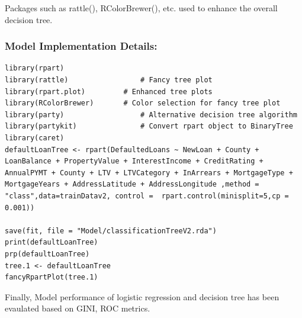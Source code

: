 Packages such as rattle(), RColorBrewer(), etc. used to enhance the overall decision tree.

\subsubsection*{Model Implementation Details:}

\begin{verbatim}
library(rpart)
library(rattle)					# Fancy tree plot
library(rpart.plot)			# Enhanced tree plots
library(RColorBrewer)		# Color selection for fancy tree plot
library(party)					# Alternative decision tree algorithm
library(partykit)				# Convert rpart object to BinaryTree
library(caret)
defaultLoanTree <- rpart(DefaultedLoans ~ NewLoan + County + LoanBalance + PropertyValue + InterestIncome + CreditRating + AnnualPYMT + County + LTV + LTVCategory + InArrears + MortgageType + MortgageYears + AddressLatitude + AddressLongitude ,method = "class",data=trainDatav2, control =  rpart.control(minisplit=5,cp = 0.001))

save(fit, file = "Model/classificationTreeV2.rda")
print(defaultLoanTree)
prp(defaultLoanTree)
tree.1 <- defaultLoanTree
fancyRpartPlot(tree.1)
\end{verbatim}

Finally, Model performance of logistic regression and decision tree has been evaulated based on GINI, ROC metrics.